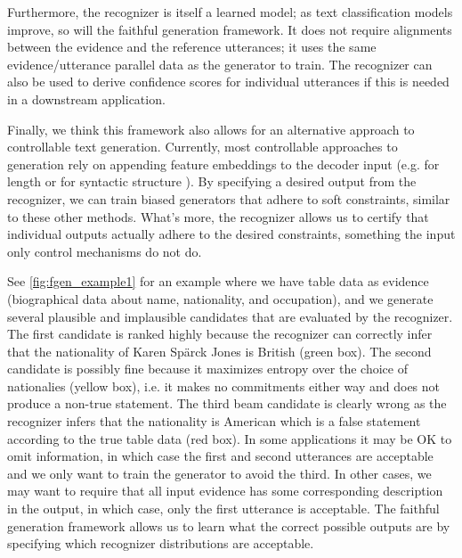 Furthermore, the recognizer is itself a learned model; 
as text classification models improve, so will the faithful generation 
framework.
It does not require
alignments between the evidence and the reference utterances; it uses
the same evidence/utterance parallel data as the generator to train.
The recognizer can also be used to derive confidence scores 
for individual utterances if this is needed
in a downstream application. 


Finally, we think this framework also allows for an alternative approach
to controllable text generation. Currently, most controllable approaches
to generation rely on appending feature embeddings to the decoder 
input (e.g. for length \cite{fan2017controllable} or for syntactic 
structure \cite{colin2018generating}). By specifying a desired output from
the recognizer, we can train biased generators that adhere to soft constraints,
similar to these other methods.
What's more, the recognizer allows us to certify that individual outputs 
actually adhere to the desired constraints, something the input only control
mechanisms do not do.










See \autoref{fig:fgen_example1} for an example 
where we have table data as evidence (biographical data about name, nationality, and 
occupation), and we generate several plausible and implausible 
candidates that are evaluated by the recognizer.
The first candidate is 
 ranked highly because the recognizer can correctly infer that the 
 nationality of Karen Sp\"arck Jones is British (green box). The second 
 candidate is possibly fine because it maximizes entropy over the choice 
 of nationalies (yellow box), i.e. it makes no commitments either way and does
 not produce a non-true statement. The third beam candidate is clearly wrong
 as the recognizer infers that the nationality is American which is a false
 statement according to the true table data (red box).
 In some applications it may be OK to omit information, in which case the first
 and second utterances are acceptable and we only want to train the generator to
 avoid the third. In other cases, we may want to require that all input
 evidence has some corresponding description in the output, in which case,
 only the first utterance is acceptable. 
 The faithful generation framework allows us to learn what the correct possible outputs are  
 by specifying which recognizer distributions are acceptable. 

